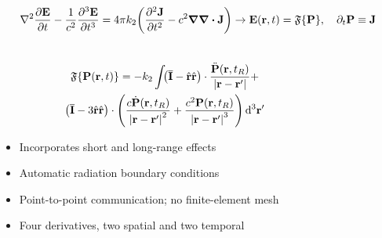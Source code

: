 \documentclass[aspectratio=169]{beamer}
\begin{document}
\begin{frame}
  \begin{equation*}
    \laplacian{\pdv{\vb{E}}{t}} - \frac{1}{c^2} \pdv[3]{\vb{E}}{t} = 4 \pi k_2 \qty(\pdv[2]{\vb{J}}{t} - c^2 \grad \div \vb{J}) \to \vb{E}(\vb{r}, t) = \mathfrak{F}\qty{\vb{P}}, \quad \partial_t \vb{P} \equiv \vb{J}
  \end{equation*}
  \vspace{-0.8cm}
  \begin{columns}
    \begin{column}{0.7\textwidth}
      \begin{equation*}
        \end{equation*}
        \begin{gather*}
          \mathfrak{F}\qty{\vb{P}(\vb{r}, t)} = -k_2 \int_{}
              \left(\overline{\mathbf{I}} -  \hat{\mathbf{r}}\hat{\mathbf{r}}\right) \cdot \frac{\ddot{\mathbf{P}}(\vb{r}, t_R)}{\left|\mathbf{r}-\mathbf{r}'\right|} + \\
              \left(\overline{\mathbf{I}} - 3\hat{\mathbf{r}}\hat{\mathbf{r}}\right) \cdot \qty(
                \frac{c\dot{\mathbf{P}}(\vb{r}, t_R)}{\left|\mathbf{r}-\mathbf{r}'\right|^2} +
                \frac{c^2   \mathbf{P}(\vb{r}, t_R)}{\left|\mathbf{r}-\mathbf{r}'\right|^3}
              )
            \, \mathrm{d}^3 \mathbf{r'}
        \end{gather*}
        \begin{itemize}
          \item Incorporates short and long-range effects
          \item Automatic radiation boundary conditions
          \item Point-to-point communication; no finite-element mesh
          \item \alert{Four derivatives, two spatial and two temporal}
        \end{itemize}
    \end{column}
    \begin{column}{0.3\textwidth}
      \centering

\end{column}
\end{columns}
\end{frame}
\end{document}
